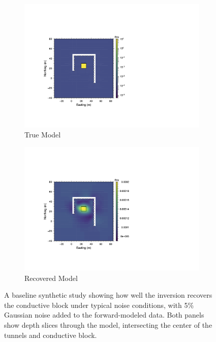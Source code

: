 \documentclass[final,authoryear,5p,times,twocolumn]{elsarticle}
\begin{document}
\begin{figure}[!ht]
   \centering

   \begin{subfigure}[b]{0.475\linewidth}
       \centering
       \includegraphics[trim=3.35cm 3.6cm 11.95cm 5.4cm, clip=true, width=\linewidth]{./Figures/Fig20a.png}
       \caption{True Model}
       \label{fig:Synth_Horseshoe_RefMod}
   \end{subfigure}
   \hfill
   \begin{subfigure}[b]{0.475\linewidth}
       \centering
       \includegraphics[trim=3.35cm 3.6cm 11.95cm 5.4cm, clip=true, width=\linewidth]{./Figures/Fig20b.png}
       \caption{Recovered Model}
       \label{fig:Synth_Horseshoe_InvMod}
   \end{subfigure}

   \caption{A baseline synthetic study showing how well the inversion recovers the conductive block under typical noise conditions, with 5\% Gaussian noise added to the forward-modeled data. Both panels show depth slices through the model, intersecting the center of the tunnels and conductive block.}
   \label{fig:Synth_HorseshoeModels}
\end{figure}
\end{document}
